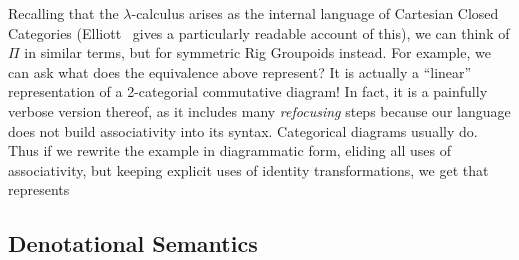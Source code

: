 Recalling that the $\lambda$-calculus arises as the internal language of Cartesian Closed Categories
(Elliott~\cite{Elliott-2017} gives a particularly readable account of this), we can think of $\Pi$ in similar terms, but
for symmetric Rig Groupoids instead. For example, we can ask what does the equivalence above represent? It is actually a
``linear'' representation of a 2-categorial commutative diagram! In fact, it is a painfully verbose version thereof, as
it includes many \emph{refocusing} steps because our language does not build associativity into its syntax. Categorical
diagrams usually do.  Thus if we rewrite the example in diagrammatic form, eliding all uses of associativity, but
keeping explicit uses of identity transformations, we get that  represents

\vspace*{3mm}


\subsection{Denotational Semantics}

